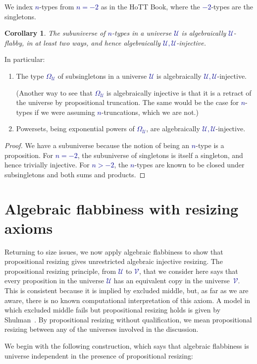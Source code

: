 \documentclass[10pt]{article}
\newcommand{\db}{\textcolor{darkblue}}
\newcommand{\m}[1]{\db{$#1$}}
\newcommand{\U}{\mathcal{U}}
\newcommand{\V}{\mathcal{V}}
\newtheorem{corollary}[numbered]{Corollary}
\theoremstyle{definition}
\begin{document}
We index \m{n}-types from \m{n=-2} as in the HoTT Book, where the
\m{-2}-types are the singletons.
\begin{corollary}
  The subuniverse of \m{n}-types in a universe \m{\U} is algebraically
  \m{\U}-flabby, in at least two ways, and hence algebraically
  \m{\U,\U}-injective.
\end{corollary}
\noindent In particular:
\begin{enumerate}
\item The type \m{\Omega_\U} of subsingletons in a universe \m{\U} is
  algebraically \m{\U,\U}-injective.

  (Another way to see that \m{\Omega_\U} is algebraically injective is
  that it is a retract of the universe by propositional
  truncation. The same would be the case for \m{n}-types if we were
  assuming \m{n}-truncations, which we are not.)

\item Powersets, being exponential powers of \m{\Omega_\U}, are
  algebraically \m{\U,\U}-injective.
\end{enumerate}
\begin{proof}
  We have a subuniverse because the notion of being an \m{n}-type is a
  proposition. For \m{n=-2}, the subuniverse of singletons is itself a
  singleton, and hence trivially injective.  For \m{n>-2}, the
  \m{n}-types are known to be closed under subsingletons and both sums
  and products.
\end{proof}

\section{Algebraic flabbiness with resizing axioms}

Returning to size issues, we now apply algebraic flabbiness to show
that propositional resizing gives unrestricted algebraic injective
resizing.
%
The propositional resizing principle, from \m{\U} to \m{\V}, that we
consider here says that every proposition in the universe \m{\U} has
an equivalent copy in the universe~\m{\V}. This is consistent because
it is implied by excluded middle, but, as far as we are aware, there
is no known computational interpretation of this axiom. A model in
which excluded middle fails but propositional resizing holds is given
by Shulman~\cite{MR3340541}. By propositional resizing without
qualification, we mean propositional resizing between any of the
universes involved in the discussion.


We begin with the following construction, which says that algebraic
flabbiness is universe independent in the presence of propositional
resizing:
\end{document}
